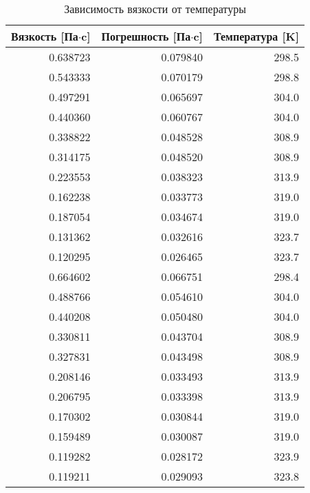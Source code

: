 \begin{table}
\centering
\caption{Зависимость вязкости от температуры}
\begin{tabular}{rrr}
\toprule
 Вязкость [Па$\cdot$c] &  Погрешность [Па$\cdot$c] &  Температура [K] \\
\midrule
              0.638723 &                  0.079840 &            298.5 \\
              0.543333 &                  0.070179 &            298.8 \\
              0.497291 &                  0.065697 &            304.0 \\
              0.440360 &                  0.060767 &            304.0 \\
              0.338822 &                  0.048528 &            308.9 \\
              0.314175 &                  0.048520 &            308.9 \\
              0.223553 &                  0.038323 &            313.9 \\
              0.162238 &                  0.033773 &            319.0 \\
              0.187054 &                  0.034674 &            319.0 \\
              0.131362 &                  0.032616 &            323.7 \\
              0.120295 &                  0.026465 &            323.7 \\
              0.664602 &                  0.066751 &            298.4 \\
              0.488766 &                  0.054610 &            304.0 \\
              0.440208 &                  0.050480 &            304.0 \\
              0.330811 &                  0.043704 &            308.9 \\
              0.327831 &                  0.043498 &            308.9 \\
              0.208146 &                  0.033493 &            313.9 \\
              0.206795 &                  0.033398 &            313.9 \\
              0.170302 &                  0.030844 &            319.0 \\
              0.159489 &                  0.030087 &            319.0 \\
              0.119282 &                  0.028172 &            323.9 \\
              0.119211 &                  0.029093 &            323.8 \\
\bottomrule
\end{tabular}
\end{table}

